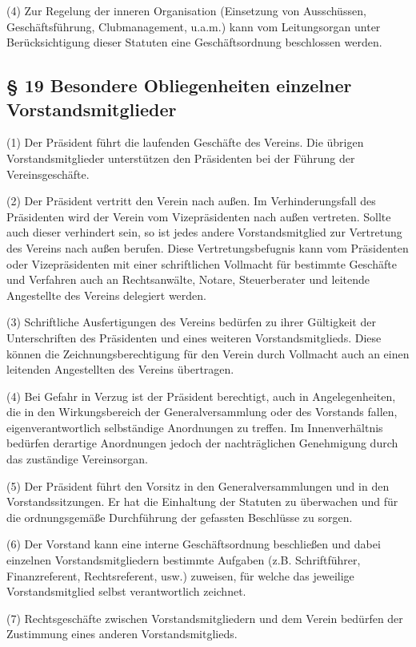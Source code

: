 \documentclass[11pt,a4paper]{article}
\begin{document}
(4)
Zur Regelung der inneren Organisation (Einsetzung von Ausschüssen, Geschäftsführung, Clubmanagement, u.a.m.) kann vom Leitungsorgan unter Berücksichtigung dieser Statuten eine Geschäftsordnung beschlossen werden.

\subsection{§ 19
Besondere Obliegenheiten einzelner Vorstandsmitglieder}

(1)
Der Präsident führt die laufenden Geschäfte des Vereins.
Die übrigen Vorstandsmitglieder unterstützen den Präsidenten bei der Führung der Vereinsgeschäfte.

(2)
Der Präsident vertritt den Verein nach außen.
Im Verhinderungsfall des Präsidenten wird der Verein vom Vizepräsidenten nach außen vertreten.
Sollte auch dieser verhindert sein, so ist jedes andere Vorstandsmitglied zur Vertretung des Vereins nach außen berufen.
Diese Vertretungsbefugnis kann vom Präsidenten oder Vizepräsidenten mit einer schriftlichen Vollmacht für bestimmte Geschäfte und Verfahren auch an Rechtsanwälte, Notare, Steuerberater und leitende Angestellte des Vereins delegiert werden.

(3)
Schriftliche Ausfertigungen des Vereins bedürfen zu ihrer Gültigkeit der Unterschriften des Präsidenten und eines weiteren Vorstandsmitglieds.
Diese können die Zeichnungsberechtigung für den Verein durch Vollmacht auch an einen leitenden Angestellten des Vereins übertragen.

(4)
Bei Gefahr in Verzug ist der Präsident berechtigt, auch in Angelegenheiten, die in den Wirkungsbereich der Generalversammlung oder des Vorstands fallen, eigenverantwortlich selbständige Anordnungen zu treffen.
Im Innenverhältnis bedürfen derartige Anordnungen jedoch der nachträglichen Genehmigung durch das zuständige Vereinsorgan.

(5)
Der Präsident führt den Vorsitz in den Generalversammlungen und in den Vorstandssitzungen.
Er hat die Einhaltung der Statuten zu überwachen und für die ordnungsgemäße Durchführung der gefassten Beschlüsse zu sorgen.

(6)
Der Vorstand kann eine interne Geschäftsordnung beschließen und dabei einzelnen Vorstandsmitgliedern bestimmte Aufgaben (z.B. Schriftführer, Finanzreferent, Rechtsreferent, usw.) zuweisen, für welche das jeweilige Vorstandsmitglied selbst verantwortlich zeichnet.

(7)
Rechtsgeschäfte zwischen Vorstandsmitgliedern und dem Verein bedürfen der Zustimmung eines anderen Vorstandsmitglieds.
\end{document}
